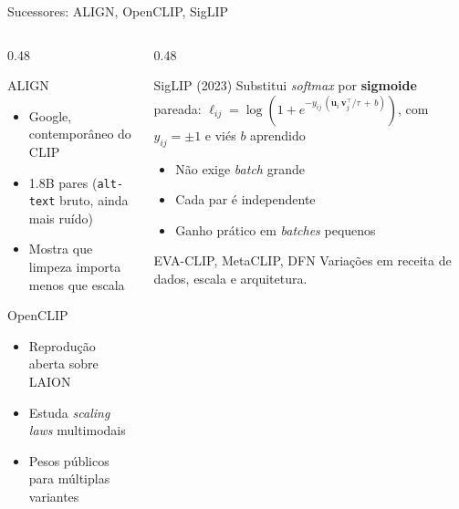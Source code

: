\documentclass[aspectratio=169,xcolor=dvipsnames]{beamer}
\begin{document}
  \begin{frame}{Sucessores: ALIGN, OpenCLIP, SigLIP}
    \begin{columns}[T]
      \begin{column}{0.48\textwidth}
        \begin{block}{ALIGN }
          \begin{itemize}
            \item Google, contemporâneo do CLIP
            \item 1.8B pares (\texttt{alt-text} bruto, ainda mais ruído)
            \item Mostra que limpeza importa menos que escala
          \end{itemize}
        \end{block}
        \begin{block}{OpenCLIP }
          \begin{itemize}
            \item Reprodução aberta sobre LAION
            \item Estuda \textit{scaling laws} multimodais
            \item Pesos públicos para múltiplas variantes
          \end{itemize}
        \end{block}
      \end{column}
      \begin{column}{0.48\textwidth}
        \begin{block}{SigLIP (2023)}
          Substitui \textit{softmax} por \textbf{sigmoide} pareada:
          $\ell_{ij} = \log\!\left(1 + e^{-y_{ij}\,(\mathbf{u}_i\,\mathbf{v}_j^{\top} / \tau \,+\, b)}\right)$, com $y_{ij} = \pm 1$ e viés $b$ aprendido
          \begin{itemize}
            \item Não exige \textit{batch} grande
            \item Cada par é independente
            \item Ganho prático em \textit{batches} pequenos
          \end{itemize}
        \end{block}
        \begin{block}{EVA-CLIP, MetaCLIP, DFN}
          Variações em receita de dados, escala e arquitetura.
        \end{block}
      \end{column}
    \end{columns}
  \end{frame}
\end{document}
